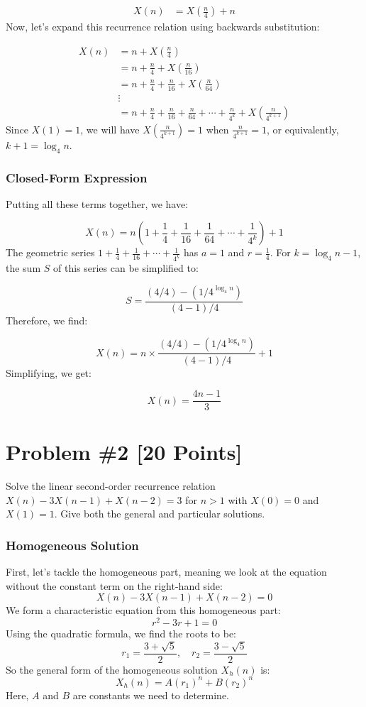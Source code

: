 \documentclass[12pt]{article}
\begin{document}
\begin{align*}
X(n) &= X\left(\frac{n}{4}\right) + n
\end{align*}
Now, let's expand this recurrence relation using backwards substitution:

\begin{align*}
X(n) &= n + X\left(\frac{n}{4}\right) \\
&= n + \frac{n}{4} + X\left(\frac{n}{16}\right) \\
&= n + \frac{n}{4} + \frac{n}{16} + X\left(\frac{n}{64}\right) \\
&\vdots \\
&= n + \frac{n}{4} + \frac{n}{16} + \frac{n}{64} + \cdots + \frac{n}{4^k} + X\left(\frac{n}{4^{k+1}}\right)
\end{align*}
Since \( X(1) = 1 \), we will have \( X\left(\frac{n}{4^{k+1}}\right) = 1 \) when \( \frac{n}{4^{k+1}} = 1 \), or equivalently, \( k+1 = \log_4{n} \).

\subsubsection*{Closed-Form Expression}
Putting all these terms together, we have:

\[
X(n) = n \left(1 + \frac{1}{4} + \frac{1}{16} + \frac{1}{64} + \cdots + \frac{1}{4^k}\right) + 1
\]
\newline\newline
The geometric series \(1 + \frac{1}{4} + \frac{1}{16} + \cdots + \frac{1}{4^k}\) has \( a = 1 \) and \( r = \frac{1}{4} \). For \( k = \log_4{n} - 1 \), the sum \( S \) of this series can be simplified to:

\[
S = \frac{(4/4) - (1/4^{\log_4{n}})}{(4 - 1)/4}
\]
Therefore, we find:

\[
X(n) = n \times \frac{(4/4) - (1/4^{\log_4{n}})}{(4 - 1)/4} + 1
\]
Simplifying, we get:

\[
X(n) = \frac{4n - 1}{3}
\]


\newpage
\section*{Problem \#2 [20 Points]}
Solve the linear second-order recurrence relation \(X(n) - 3X(n-1) + X(n-2) = 3\) for \( n > 1 \) with \( X(0) = 0 \) and \( X(1) = 1 \). Give both the general and particular solutions.
\subsubsection*{Homogeneous Solution}
First, let's tackle the homogeneous part, meaning we look at the equation without the constant term on the right-hand side:
\[
X(n) - 3X(n-1) + X(n-2) = 0
\]
We form a characteristic equation from this homogeneous part:
\[
r^2 - 3r + 1 = 0
\]
Using the quadratic formula, we find the roots to be:
\[
r_1 = \frac{3 + \sqrt{5}}{2}, \quad r_2 = \frac{3 - \sqrt{5}}{2}
\]
So the general form of the homogeneous solution \( X_h(n) \) is:
\[
X_h(n) = A(r_1)^n + B(r_2)^n
\]
Here, \( A \) and \( B \) are constants we need to determine.
\end{document}
